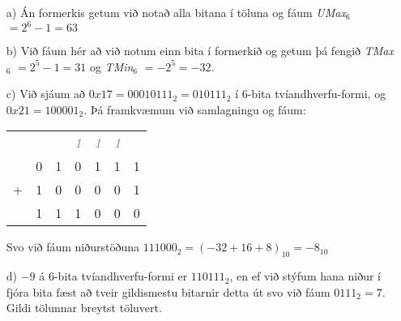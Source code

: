 \documentclass{article}
\begin{document}
	\begin{itemize}
		\item[a)] Án formerkis getum við notað alla bitana í töluna og fáum 
			\textit{UMax$_6$} $= 2^6-1 = 63$
		\item[b)] Við fáum hér að við notum einn bita í formerkið og getum 
			þá fengið \textit{TMax$_6$} $= 2^5 - 1 = 31$ og
			\textit{TMin$_6$} $= -2^5 = -32$.
		\item[c)] Við sjáum að $0x17 = 00010111_2 = 010111_2$ í 6-bita 
			tvíandhverfu-formi, og $0x21 = 100001_2$. Þá framkvæmum við 
			samlagningu og fáum:

			\begin{center}
			\begin{tabular}{c@{\,}c@{\,}c@{\,}c@{\,}c@{\,}c@{\,}c}
				  &   &   & \textit{\textcolor{gray}{1}} & \textit{\textcolor{gray}{1}} & \textit{\textcolor{gray}{1}} &   \\
				  & 0 & 1 & 0 & 1 & 1 & 1 \\
				+ & 1 & 0 & 0 & 0 & 0 & 1 \\
				\hline
				  & 1 & 1 & 1 & 0 & 0 & 0 \\
			\end{tabular}
			\end{center}

			Svo við fáum niðurstöðuna $111000_2 = (-32 + 16 + 8)_{10} = -8_{10}$
		\item[d)] $-9$ á 6-bita tvíandhverfu-formi er $110111_2$, en ef við 
			stýfum hana niður í fjóra bita fæst að tveir gildismestu 
			bitarnir detta út svo við fáum $0111_2 = 7$. Gildi tölunnar 
			breytst töluvert.
	\end{itemize}

	\section{}
\end{document}
